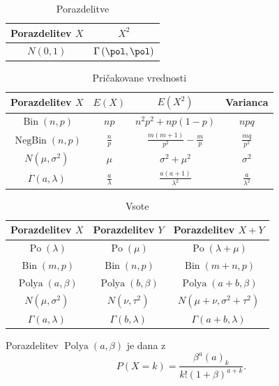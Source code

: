 

\begin{table}[h!]
  \centering
  \begin{tabular}{|c|c|}
	\hline
	Porazdelitev $X$ & $X^2$ \\
	\hline
	$N(0,1)$ & $\displaystyle \Gamma\left(\pol, \pol\right)$ \\
	\hline
  \end{tabular}
  \caption{Porazdelitve}
\end{table}

\begin{table}[h!]
  \centering
  \begin{tabular}{|c|c|c|c|}
	\hline
	Porazdelitev $X$ & $E(X)$ & $E(X^2)$ & Varianca \\
	\hline
	$\operatorname{Bin}(n, p)$ & $np$ & $n^2 p^2 + np(1-p)$ & $npq$ \\
	$\operatorname{NegBin}(n, p)$ & $\displaystyle \frac{n}{p}$ & $\displaystyle \frac{m(m+1)}{p^2} - \frac{m}{p}$ & $\displaystyle \frac{mq}{p^2}$ \\
	$N(\mu, \sigma^2)$ & $\mu$ & $\sigma^2 + \mu^2$ & $\sigma^2$ \\
	$\Gamma(a, \lambda)$ & $\displaystyle \frac{a}{\lambda}$ & $\displaystyle \frac{a(a+1)}{\lambda^2}$ & $\displaystyle \frac{a}{\lambda^2}$ \\
	\hline
  \end{tabular}
  \caption{Pričakovane vrednosti}
\end{table}

\begin{table}[h!]
  \centering
  \begin{tabular}{|c|c|c|}
	\hline
	Porazdelitev $X$ & Porazdelitev $Y$ & Porazdelitev $X+Y$ \\
	\hline
	$\operatorname{Po}(\lambda)$ & $\operatorname{Po}(\mu)$ & $\operatorname{Po}(\lambda+\mu)$ \\
	$\operatorname{Bin}(m, p)$ & $\operatorname{Bin}(n, p)$ & $\operatorname{Bin}(m+n, p)$ \\
	$\operatorname{Polya}(a, \beta)$ & $\operatorname{Polya}(b, \beta)$ & $\operatorname{Polya}(a+b, \beta)$ \\
	$N(\mu, \sigma^2)$ & $N(\nu, \tau^2)$ & $N(\mu+\nu, \sigma^2 + \tau^2)$ \\
	$\Gamma(a, \lambda)$ & $\Gamma(b, \lambda)$ & $\Gamma(a+b, \lambda)$ \\
	\hline
  \end{tabular}
  \caption{Vsote}
\end{table}

Porazdelitev $\operatorname{Polya}(a, \beta)$ je dana z
\[
  P(X = k) = \frac{\beta^a (a)_k}{k! (1+\beta)^{a+k}}.
\]